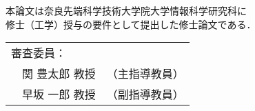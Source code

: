 \renewcommand\thepage{Title2}
\thispagestyle{empty}
\vspace*{8cm}
\begin{center}
本論文は奈良先端科学技術大学院大学情報科学研究科に$\ $ \\
修士（工学）授与の要件として提出した修士論文である．

 \bigskip

 \jauthor
 \vspace*{0.4cm}
 \begin{table}[h]
 \begin{center}
	\begin{tabular}[t]{p{}ll}
	 \multicolumn{2}{l}{審査委員：} \\
	 & 関 豊太郎 教授 & （主指導教員） \\
	 & 早坂 一郎 教授 & （副指導教員）
	\end{tabular}
 \end{center}
 \end{table}
 \end{center}
